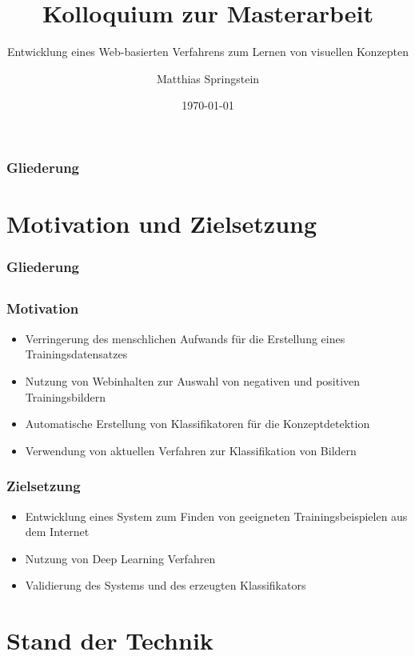\documentclass[utf8]{beamer}
\title{Kolloquium zur Masterarbeit}
\subtitle{Entwicklung eines Web-basierten Verfahrens zum Lernen von visuellen Konzepten}
\author[M. Springstein]{Matthias Springstein}
\date{\today}
\begin{document}
{

\begin{frame}
    \titlepage
\end{frame}
}

\begin{frame}
    \frametitle{Gliederung}
    \tableofcontents
\end{frame}

\section{Motivation und Zielsetzung}
\begin{frame}
    \frametitle{Gliederung}
    \tableofcontents[currentsection]
\end{frame}

\subsection{}
\begin{frame}
    \frametitle{Motivation}
    \begin{itemize}
        \item Verringerung des menschlichen Aufwands für die Erstellung eines Trainingsdatensatzes
        \item Nutzung von Webinhalten zur Auswahl von negativen und positiven Trainingsbildern
        \item Automatische Erstellung von Klassifikatoren für die Konzeptdetektion
        \item Verwendung von aktuellen Verfahren zur Klassifikation von Bildern
    \end{itemize}
\end{frame}

\begin{frame}
    \frametitle{Zielsetzung}
    \begin{itemize}
        \item Entwicklung eines System zum Finden von geeigneten Trainingsbeispielen aus dem Internet
        \item Nutzung von Deep Learning Verfahren
        \item Validierung des Systems und des erzeugten Klassifikators
    \end{itemize}
\end{frame}

\section{Stand der Technik}
\end{document}
